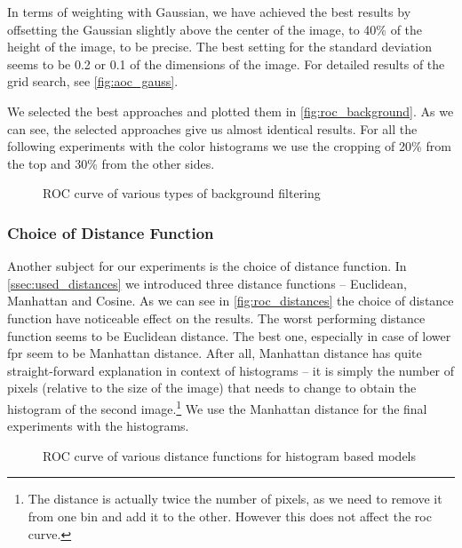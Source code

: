 In terms of weighting with Gaussian, we have achieved the best results
by offsetting the Gaussian slightly above the center of the image, to 40\%
of the height of the image, to be precise. The best setting for the standard deviation seems to be 0.2 or 0.1 of the dimensions of the image. For detailed results
of the grid search, see \autoref{fig:aoc_gauss}.

We selected the best approaches and plotted them in \autoref{fig:roc_background}. As we can see, the selected approaches give us almost identical results. For all the following experiments with the color histograms we use the cropping of 20\% from the top and 30\% from the other sides.

\begin{figure}
    \centering
    \def\svgwidth{\columnwidth}
    
    \caption{ROC curve of various types of background filtering}
    \label{fig:roc_background}
\end{figure}

\subsubsection{Choice of Distance Function}

Another subject for our experiments is the choice of distance function. In
\autoref{ssec:used_distances} we introduced three distance functions --
Euclidean, Manhattan and Cosine. As we can see in \autoref{fig:roc_distances}
the choice of distance function have noticeable effect on the results.
The worst performing distance function seems to be Euclidean distance. The best one,
especially in case of lower \gls{fpr} seem to be Manhattan distance.
After all, Manhattan distance has quite straight-forward explanation in context
of histograms -- it is simply the number of pixels (relative to the size of the image) that needs to change to obtain the histogram of the second image.\footnote{The distance is actually twice the number of pixels, as we need to remove it from one bin and add it to the other. However this does not affect the \gls{roc} curve.} We use the Manhattan distance for the final experiments with the histograms.

\begin{figure}
    \centering
    \def\svgwidth{\columnwidth}
    
    \caption{ROC curve of various distance functions for histogram based models}
    \label{fig:roc_distances}
\end{figure}

